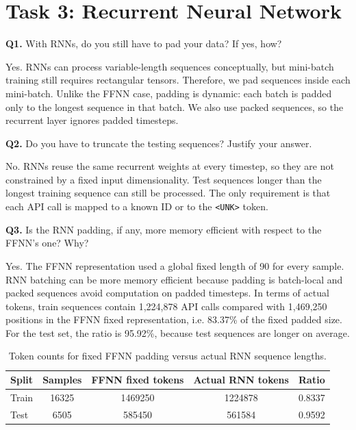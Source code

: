 \section{Task 3: Recurrent Neural Network}

\begin{questionbox}
\textbf{Q1.} With RNNs, do you still have to pad your data? If yes, how?
\end{questionbox}

Yes. RNNs can process variable-length sequences conceptually, but mini-batch training still requires
rectangular tensors. Therefore, we pad sequences inside each mini-batch. Unlike the FFNN case, padding
is dynamic: each batch is padded only to the longest sequence in that batch. We also use packed
sequences, so the recurrent layer ignores padded timesteps.

\begin{questionbox}
\textbf{Q2.} Do you have to truncate the testing sequences? Justify your answer.
\end{questionbox}

No. RNNs reuse the same recurrent weights at every timestep, so they are not constrained by a fixed
input dimensionality. Test sequences longer than the longest training sequence can still be processed.
The only requirement is that each API call is mapped to a known ID or to the \texttt{<UNK>} token.

\begin{questionbox}
\textbf{Q3.} Is the RNN padding, if any, more memory efficient with respect to the FFNN's one? Why?
\end{questionbox}

Yes. The FFNN representation used a global fixed length of 90 for every sample. RNN batching can be
more memory efficient because padding is batch-local and packed sequences avoid computation on padded
timesteps. In terms of actual tokens, train sequences contain 1,224,878 API calls compared with
1,469,250 positions in the FFNN fixed representation, i.e. 83.37\% of the fixed padded size. For the
test set, the ratio is 95.92\%, because test sequences are longer on average.

\begin{table}[h!]
\centering
\begin{tabular}{lcccc}
\hline
\textbf{Split} & \textbf{Samples} & \textbf{FFNN fixed tokens} & \textbf{Actual RNN tokens} & \textbf{Ratio} \\
\hline
Train & 16325 & 1469250 & 1224878 & 0.8337 \\
Test  & 6505  & 585450  & 561584  & 0.9592 \\
\hline
\end{tabular}
\caption{Token counts for fixed FFNN padding versus actual RNN sequence lengths.}
\label{tab:task3_padding_memory}
\end{table}

